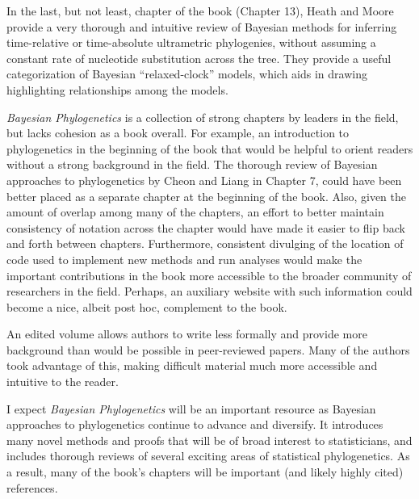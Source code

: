 \documentclass[letterpaper,12pt]{article}
\newcommand{\booktitle}{\textit{Bayesian Phylogenetics}\xspace}
\begin{document}
In the last, but not least, chapter of the book (Chapter 13),
Heath and Moore provide a very thorough and intuitive review of Bayesian
methods for inferring time-relative or time-absolute ultrametric phylogenies,
without assuming a constant rate of nucleotide substitution across the tree.
They provide a useful categorization of Bayesian ``relaxed-clock'' models,
which aids in drawing highlighting relationships among the models.

\booktitle is a collection of strong chapters by leaders in the field, but
lacks cohesion as a book overall.
For example, an introduction to phylogenetics in the beginning of the book that
would be helpful to orient readers without a strong background in the field.
The thorough review of Bayesian approaches to phylogenetics by Cheon and Liang
in Chapter 7, could have been better placed as a separate chapter at the
beginning of the book.
Also, given the amount of overlap among many of the chapters, an effort to
better maintain consistency of notation across the chapter would have made it
easier to flip back and forth between chapters.
Furthermore, consistent divulging of the location of code used to implement new
methods and run analyses would make the important contributions in the book
more accessible to the broader community of researchers in the field.
Perhaps, an auxiliary website with such information could become a nice, albeit
post hoc, complement to the book.

An edited volume allows authors to write less formally and provide more
background than would be possible in peer-reviewed papers.
Many of the authors took advantage of this, making difficult material much more
accessible and intuitive to the reader.

I expect \booktitle will be an important resource as Bayesian approaches to
phylogenetics continue to advance and diversify.
It introduces many novel methods and proofs that will be of broad interest to
statisticians, and includes thorough reviews of several exciting areas of
statistical phylogenetics.
As a result, many of the book's chapters will be important (and likely highly
cited) references.



\end{document}
